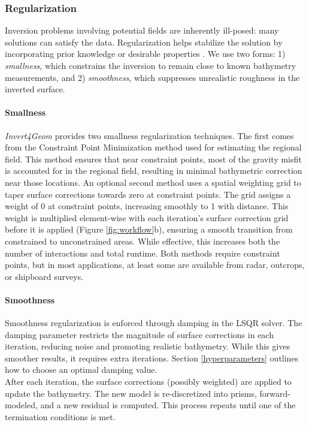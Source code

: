 \documentclass[tc, manuscript]{copernicus}
\begin{document}
\subsubsection{Regularization}
Inversion problems involving potential fields are inherently ill-posed: many solutions can satisfy the data. Regularization helps stabilize the solution by incorporating prior knowledge or desirable properties \citep{asterparameter2018}. We use two forms: 1) \textit{smallness}, which constrains the inversion to remain close to known bathymetry measurements, and 2) \textit{smoothness}, which suppresses unrealistic roughness in the inverted surface.

\paragraph*{Smallness}
\textit{Invert4Geom} provides two smallness regularization techniques. The first comes from the Constraint Point Minimization method used for estimating the regional field. This method ensures that near constraint points, most of the gravity misfit is accounted for in the regional field, resulting in minimal bathymetric correction near those locations. An optional second method uses a spatial weighting grid to taper surface corrections towards zero at constraint points. The grid assigns a weight of 0 at constraint points, increasing smoothly to 1 with distance. This weight is multiplied element-wise with each iteration's surface correction grid before it is applied (Figure \ref{fig:workflow}b), ensuring a smooth transition from constrained to unconstrained areas. While effective, this increases both the number of interactions and total runtime. Both methods require constraint points, but in most applications, at least some are available from radar, outcrops, or shipboard surveys.

\paragraph*{Smoothness}
Smoothness regularization is enforced through damping in the LSQR solver. The damping parameter restricts the magnitude of surface corrections in each iteration, reducing noise and promoting realistic bathymetry. While this gives smoother results, it requires extra iterations. Section \ref{hyperparameters} outlines how to choose an optimal damping value.\\

After each iteration, the surface corrections (possibly weighted) are applied to update the bathymetry. The new model is re-discretized into prisms, forward-modeled, and a new residual is computed. This process repeats until one of the termination conditions is met.
\end{document}
